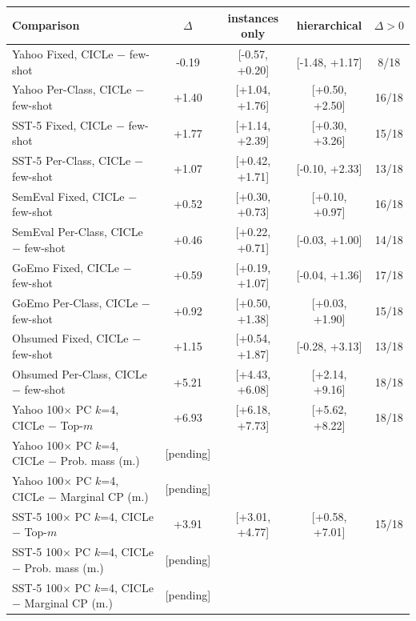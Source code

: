 \begin{tabular}{lcccc}
\toprule
Comparison & $\Delta$ & instances only & hierarchical & $\Delta>0$ \\
\midrule
Yahoo Fixed, CICLe $-$ few-shot & -0.19 & [-0.57, +0.20] & [-1.48, +1.17] & 8/18 \\
Yahoo Per-Class, CICLe $-$ few-shot & +1.40 & [+1.04, +1.76] & [+0.50, +2.50] & 16/18 \\
SST-5 Fixed, CICLe $-$ few-shot & +1.77 & [+1.14, +2.39] & [+0.30, +3.26] & 15/18 \\
SST-5 Per-Class, CICLe $-$ few-shot & +1.07 & [+0.42, +1.71] & [-0.10, +2.33] & 13/18 \\
SemEval Fixed, CICLe $-$ few-shot & +0.52 & [+0.30, +0.73] & [+0.10, +0.97] & 16/18 \\
SemEval Per-Class, CICLe $-$ few-shot & +0.46 & [+0.22, +0.71] & [-0.03, +1.00] & 14/18 \\
GoEmo Fixed, CICLe $-$ few-shot & +0.59 & [+0.19, +1.07] & [-0.04, +1.36] & 17/18 \\
GoEmo Per-Class, CICLe $-$ few-shot & +0.92 & [+0.50, +1.38] & [+0.03, +1.90] & 15/18 \\
Ohsumed Fixed, CICLe $-$ few-shot & +1.15 & [+0.54, +1.87] & [-0.28, +3.13] & 13/18 \\
Ohsumed Per-Class, CICLe $-$ few-shot & +5.21 & [+4.43, +6.08] & [+2.14, +9.16] & 18/18 \\
\midrule
Yahoo 100$\times$ PC $k$=4, CICLe $-$ Top-$m$ & +6.93 & [+6.18, +7.73] & [+5.62, +8.22] & 18/18 \\
Yahoo 100$\times$ PC $k$=4, CICLe $-$ Prob. mass (m.) & [pending] & & & \\
Yahoo 100$\times$ PC $k$=4, CICLe $-$ Marginal CP (m.) & [pending] & & & \\
SST-5 100$\times$ PC $k$=4, CICLe $-$ Top-$m$ & +3.91 & [+3.01, +4.77] & [+0.58, +7.01] & 15/18 \\
SST-5 100$\times$ PC $k$=4, CICLe $-$ Prob. mass (m.) & [pending] & & & \\
SST-5 100$\times$ PC $k$=4, CICLe $-$ Marginal CP (m.) & [pending] & & & \\
\bottomrule
\end{tabular}
